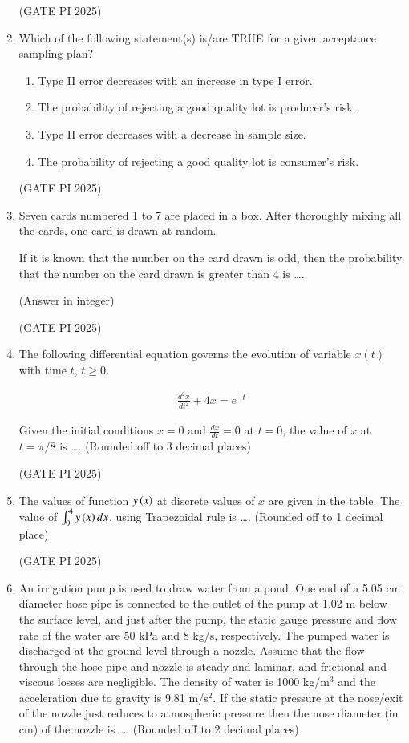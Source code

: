 \documentclass[journal,12pt,onecolumn]{IEEEtran}
\theoremstyle{remark}
\begin{document}
\begin{enumerate}
\hfill (GATE PI 2025)

\item Which of the following statement(s) is/are TRUE for a given acceptance sampling plan?

\begin{enumerate}
\item Type II error decreases with an increase in type I error.
\item The probability of rejecting a good quality lot is producer's risk.
\item Type II error decreases with a decrease in sample size.
\item The probability of rejecting a good quality lot is consumer's risk.
\end{enumerate}

\hfill (GATE PI 2025)

\item Seven cards numbered 1 to 7 are placed in a box. After thoroughly mixing all the cards, one card is drawn at random.

If it is known that the number on the card drawn is odd, then the probability that the number on the card drawn is greater than 4 is \dots.

(Answer in integer)

\hfill (GATE PI 2025)

\item The following differential equation governs the evolution of variable $x(t)$ with time $t$, $t \geq 0$.

\begin{align*}
\frac{d^2x}{dt^2} + 4x = e^{-t}
\end{align*}

Given the initial conditions $x = 0$ and $\frac{dx}{dt} = 0$ at $t = 0$, the value of $x$ at $t = \pi/8$ is \dots .
(Rounded off to 3 decimal places)

\hfill (GATE PI 2025)

\item The values of function $y\left(x\right)$ at discrete values of $x$ are given in the table. The value of $\int_0^4 y\left(x\right)dx$, using Trapezoidal rule is \dots .
(Rounded off to 1 decimal place)



\hfill (GATE PI 2025)

\item An irrigation pump is used to draw water from a pond. One end of a 5.05 cm diameter hose pipe is connected to the outlet of the pump at 1.02 m below the surface level, and just after the pump, the static gauge pressure and flow rate of the water are 50 kPa and 8 kg/s, respectively. The pumped water is discharged at the ground level through a nozzle. Assume that the flow through the hose pipe and nozzle is steady and laminar, and frictional and viscous losses are negligible. The density of water is 1000 kg/m$^3$ and the acceleration due to gravity is 9.81 m/s$^2$. If the static pressure at the nose/exit of the nozzle just reduces to atmospheric pressure then the nose diameter (in cm) of the nozzle is \dots . (Rounded off to 2 decimal places)


\end{enumerate}
\end{document}
